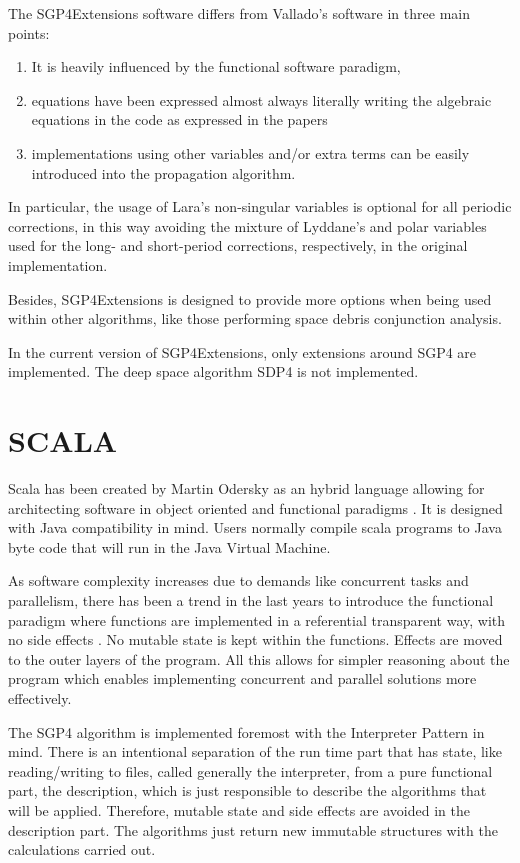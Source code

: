 \documentclass{article}
\begin{document}
The SGP4Extensions software differs from Vallado's software in three main points:
\begin{enumerate}
  \item  It is heavily influenced by the functional software paradigm,
  \item  equations have been expressed almost always literally writing the algebraic equations in the code as expressed in the papers
  \item  implementations using other variables and/or extra terms can be easily introduced into the propagation algorithm.
\end{enumerate}
In particular, the usage of Lara's non-singular variables \cite{Lara2015MPE} is optional for all periodic corrections, in this way avoiding the mixture of Lyddane's and polar variables used for the long- and short-period corrections, respectively, in the original implementation.

Besides, SGP4Extensions is designed to provide more options when being used within other algorithms, like those performing space debris conjunction analysis.

In the current version of SGP4Extensions, only extensions around SGP4 are implemented. The deep space algorithm SDP4 is not implemented.

\section{SCALA}
\label{sec:scala}

Scala has been created by Martin Odersky as an hybrid language allowing for architecting software in object oriented and functional paradigms \cite{scala-overview-tech-report}. It is designed with Java compatibility in mind. Users normally compile scala programs to Java byte code that will run in the Java Virtual Machine.

As software complexity increases due to demands like concurrent tasks and parallelism,
there has been a trend in the last years to introduce the functional paradigm where
functions are implemented in a referential transparent way, with no side effects \cite{ChBj}.
No mutable state is kept within the functions. Effects are moved to the outer layers
of the program. All this allows for simpler reasoning about the program which enables
implementing concurrent and parallel solutions more effectively.

The SGP4 algorithm is implemented foremost with the Interpreter Pattern in mind.
There is an intentional
separation of the run time part that has state, like reading/writing to files, called
generally the interpreter, from a pure functional part, the description, which is just
responsible to describe the algorithms that will be applied.
Therefore, mutable state and side effects are avoided in the description part.
The algorithms just return new immutable structures
with the calculations carried out.
\end{document}
